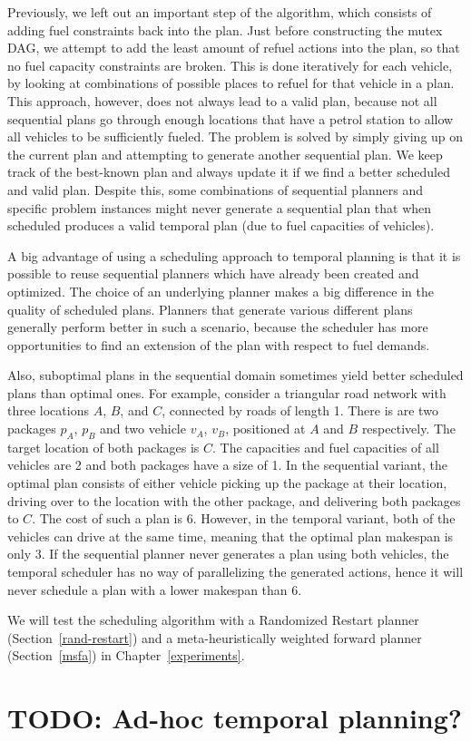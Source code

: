 Previously, we left out an important step of the algorithm,
which consists of adding fuel constraints back into the plan.
Just before constructing the mutex DAG,
we attempt to add the least amount of refuel actions
into the plan, so that no fuel capacity constraints are broken.
This is done iteratively for each vehicle,
by looking at combinations of possible places to refuel for that vehicle in a plan.
This approach, however, does not always lead to a valid plan,
because not all
sequential plans go through enough locations that have a petrol station
to allow all vehicles to be sufficiently fueled.
The problem is solved by simply giving up on the current plan
and attempting to generate another sequential plan.
We keep track of the best-known plan and always update it
if we find a better scheduled and valid plan.
Despite this, some combinations of sequential planners
and specific problem instances might never generate a sequential plan
that when scheduled produces a valid temporal plan (due to fuel capacities of vehicles).

A big advantage of using a scheduling approach to temporal planning
is that it is possible to
reuse sequential planners which have already been created
and optimized.
The choice of an underlying planner makes a big difference
in the quality of scheduled plans. Planners
that generate various different plans generally perform better
in such a scenario, because the scheduler has more
opportunities to find an extension of the plan with respect to fuel demands.

Also, suboptimal plans in the sequential domain
sometimes yield better scheduled plans than optimal ones.
For example, consider a triangular road network with three locations $A$, $B$, and $C$, connected by roads of length 1.
There is are two packages $p_A$, $p_B$ and two vehicle $v_A$, $v_B$,
positioned at $A$ and $B$ respectively. The target location of both
packages is $C$. The capacities and fuel capacities of all vehicles
are 2 and both packages have a size of 1.
In the sequential variant, the optimal plan consists of either
vehicle picking up the package at their location, driving
over to the location with the other package, and delivering both packages
to $C$. The cost of such a plan is $6$.
However, in the temporal variant, both of the vehicles can drive at the same time, meaning that the optimal plan makespan is only $3$.
If the sequential planner never generates a plan
using both vehicles, the temporal scheduler has no way of
parallelizing the generated actions, hence it will never
schedule a plan with a lower makespan than $6$.

We will test the scheduling algorithm with a Randomized Restart planner (Section~\ref{rand-restart})
and a meta-heuristically weighted forward planner (Section~\ref{msfa}) in Chapter~\ref{experiments}.



























\section{TODO: Ad-hoc temporal planning?}\label{temporal-approach}
